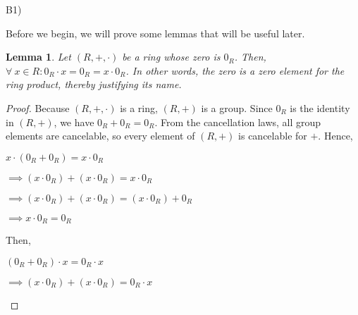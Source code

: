 \documentclass[executivepaper]{article}
\newtheorem{lemma}{Lemma}
\begin{document}
\begin{flushleft}

B1)

Before we begin, we will prove some lemmas that will be useful later.

\vspace{2mm}

\begin{lemma}

Let $\left(R, +, \cdot \right)$ be a ring whose zero is $0_{R}$. Then, $\forall ~ x \in R: 0_{R} \cdot x=0_{R}=x \cdot 0_{R}$. In other words, the zero is a zero element for the ring product, thereby justifying its name.

\end{lemma}

\begin{proof}

Because $\left(R, +, \cdot \right)$ is a ring, $\left(R, +\right)$ is a group. Since $0_{R}$ is the identity in $\left(R, +\right)$, we have $0_{R} + 0_{R}=0_{R}$. From the cancellation laws, all group elements are cancelable, so every 	element of $\left(R, +\right)$ is cancelable for $+$. Hence,

\begin{center}

$x \cdot \left(0_{R} + 0_{R}\right)=x \cdot 0_{R}$

\vspace{2mm}

$\implies \left(x \cdot 0_{R}\right) + \left(x \cdot 0_{R}\right)=x \cdot 0_{R}$

\vspace{2mm}

$\implies \left(x \cdot 0_{R}\right) + \left(x \cdot 0_{R}\right)=\left(x \cdot 0_{R}\right) + 0_{R}$

\vspace{2mm}

$\implies x \cdot 0_{R}=0_{R}$

\end{center}

Then,

\begin{center}

$\left(0_{R} + 0_{R}\right) \cdot x=0_{R} \cdot x$

\vspace{2mm}

$\implies \left(x \cdot 0_{R}\right) + \left(x \cdot 0_{R}\right)=0_{R} \cdot x$

\vspace{2mm}


\end{center}
\end{proof}
\end{flushleft}
\end{document}
